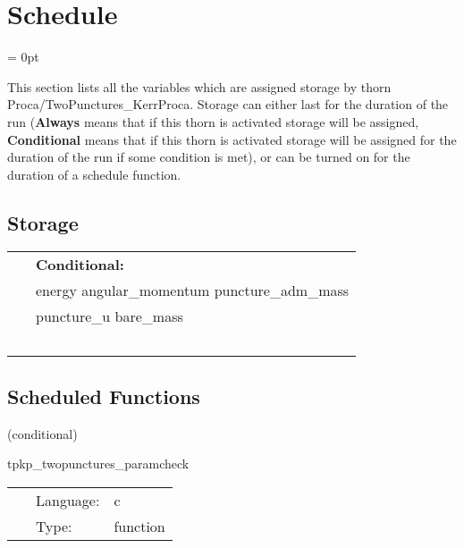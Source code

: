 
\section{Schedule} 


\parskip = 0pt


\noindent This section lists all the variables which are assigned storage by thorn Proca/TwoPunctures\_KerrProca.  Storage can either last for the duration of the run ({\bf Always} means that if this thorn is activated storage will be assigned, {\bf Conditional} means that if this thorn is activated storage will be assigned for the duration of the run if some condition is met), or can be turned on for the duration of a schedule function.


\subsection*{Storage}

\hspace{5mm}

 \begin{tabular*}{160mm}{ll} 
~& {\bf Conditional:} \\ 
~ &  energy angular\_momentum puncture\_adm\_mass\\ 
~ &  puncture\_u bare\_mass\\ 
~ & ~\\ 
\end{tabular*} 


\subsection*{Scheduled Functions}
\vspace{5mm}

   (conditional) 

\hspace{5mm} tpkp\_twopunctures\_paramcheck 

\hspace{5mm}{\it check parameters and thorn needs } 


\hspace{5mm}

 \begin{tabular*}{160mm}{cll} 
~ & Language:  & c \\ 
~ & Type:  & function \\ 
\end{tabular*} 


\vspace{5mm}

